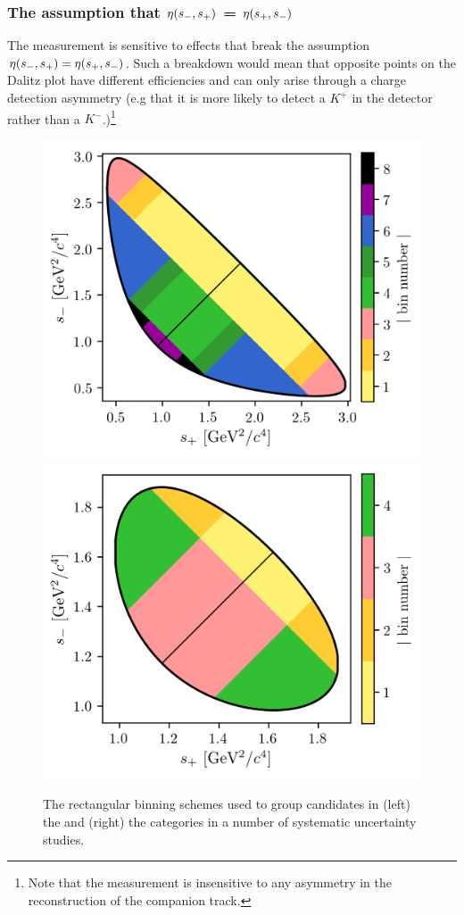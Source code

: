 \subsubsection{The assumption that \texorpdfstring{$\eta(s_-, s_+)$}{eta(s-,s+)} = \texorpdfstring{$\eta(s_+, s_-)$}{eta(s+,s-)}}
\label{subs:eta_symmetry}


The measurement is sensitive to effects that break the assumption $\eta(s_-, s_+)=\eta(s_+, s_-)$. Such a breakdown would mean that opposite points on the Dalitz plot have different efficiencies and can only arise through a charge detection asymmetry (e.g that it is more likely to detect a $K^+$ in the detector rather than a $K^-$.)\footnote{Note that the measurement is insensitive to any asymmetry in the reconstruction of the companion track.}

\begin{figure}[tp]
    \centering
    \includegraphics[width=0.45\columnwidth]{figures/theory/binnings/KsPiPi_rect.png}
    \includegraphics[width=0.45\columnwidth]{figures/theory/binnings/KsKK_rect.png}
    \caption{The rectangular binning schemes used to group candidates in (left) the \DtoKspipi and (right) the \DtoKsKK categories in a number of systematic uncertainty studies.}
    \label{fig:rect_bins}
\end{figure}

